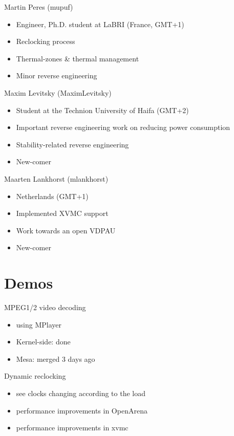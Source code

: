 \documentclass[11pt,english,compress]{beamer}
\begin{document}
		\begin{frame}
			\begin{block}{Martin Peres (mupuf)}
				\begin{itemize}
					\item Engineer, Ph.D. student at LaBRI (France, GMT+1)
					\item Reclocking process
					\item Thermal-zones \& thermal management
					\item Minor reverse engineering
				\end{itemize}
			\end{block}

			\begin{block}{Maxim Levitsky (MaximLevitsky)}
				\begin{itemize}
					\item Student at the Technion University of Haifa (GMT+2)
					\item Important reverse engineering work on reducing power consumption
					\item Stability-related reverse engineering
					\item New-comer
				\end{itemize}
			\end{block}
		\end{frame}

		\begin{frame}
			\begin{block}{Maarten Lankhorst (mlankhorst)}
				\begin{itemize}
					\item Netherlands (GMT+1)
					\item Implemented XVMC support
					\item Work towards an open VDPAU
					\item New-comer
				\end{itemize}
			\end{block}
		\end{frame}

\section{Demos}
	\begin{frame}
		\begin{block}{MPEG1/2 video decoding}
			\begin{itemize}
				\item using MPlayer
				\item Kernel-side: done
				\item Mesa: merged 3 days ago
			\end{itemize}
		\end{block}
	\end{frame}

	\begin{frame}
		\begin{block}{Dynamic reclocking}
			\begin{itemize}
				\item see clocks changing according to the load
				\item performance improvements in OpenArena
				\item performance improvements in xvmc
			\end{itemize}
		\end{block}
	\end{frame}
\end{document}
